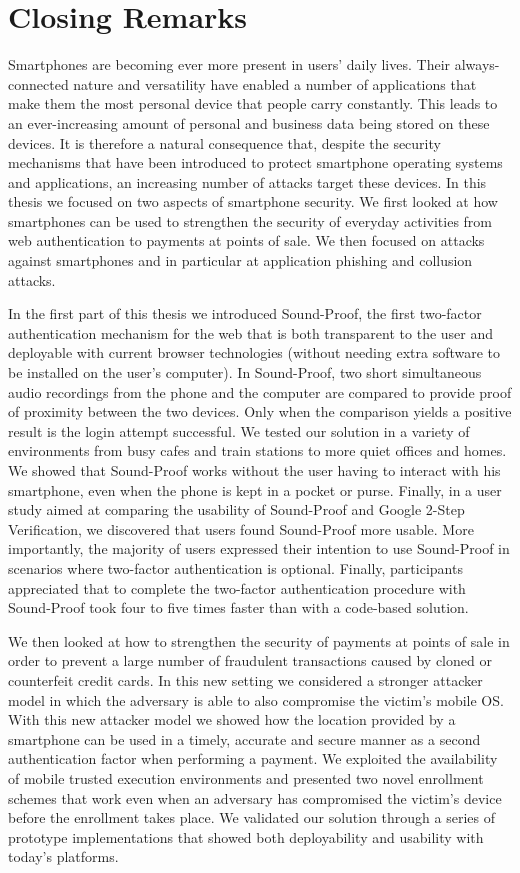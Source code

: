 \chapter{Closing Remarks}
\label{chap:conclusion}

Smartphones are becoming ever more present in users' daily lives. Their always-connected nature and versatility have enabled a number of applications that make them the most personal device that people carry constantly. This leads to an ever-increasing amount of personal and business data being stored on these devices. It is therefore a natural consequence that, despite the security mechanisms that have been introduced to protect smartphone operating systems and applications, an increasing number of attacks target these devices. In this thesis we focused on two aspects of smartphone security. We first looked at how smartphones can be used to strengthen the security of everyday activities from web authentication to payments at points of sale. We then focused on attacks against smartphones and in particular at application phishing and collusion attacks.

In the first part of this thesis we introduced Sound-Proof, the first two-factor authentication mechanism for the web that is both transparent to the user and deployable with current browser technologies (without needing extra software to be installed on the user's computer). In Sound-Proof, two short simultaneous audio recordings from the phone and the computer are compared to provide proof of proximity between the two devices. Only when the comparison yields a positive result is the login attempt successful. We tested our solution in a variety of environments from busy cafes and train stations to more quiet offices and homes. We showed that Sound-Proof works without the user having to interact with his smartphone, even when the phone is kept in a pocket or purse. Finally, in a user study aimed at comparing the usability of Sound-Proof and Google 2-Step Verification, we discovered that users found Sound-Proof more usable. More importantly, the majority of users expressed their intention to use Sound-Proof in scenarios where two-factor authentication is optional. Finally, participants appreciated that to complete the two-factor authentication procedure with Sound-Proof took four to five times faster than with a code-based solution.

We then looked at how to strengthen the security of payments at points of sale in order to prevent a large number of fraudulent transactions caused by cloned or counterfeit credit cards. In this new setting we considered a stronger attacker model in which the adversary is able to also compromise the victim's mobile OS. With this new attacker model we showed how the location provided by a smartphone can be used in a timely, accurate and secure manner as a second authentication factor when performing a payment. We exploited the availability of mobile trusted execution environments and presented two novel enrollment schemes that work even when an adversary has compromised the victim's device before the enrollment takes place. We validated our solution through a series of prototype implementations that showed both deployability and usability with today's platforms.

